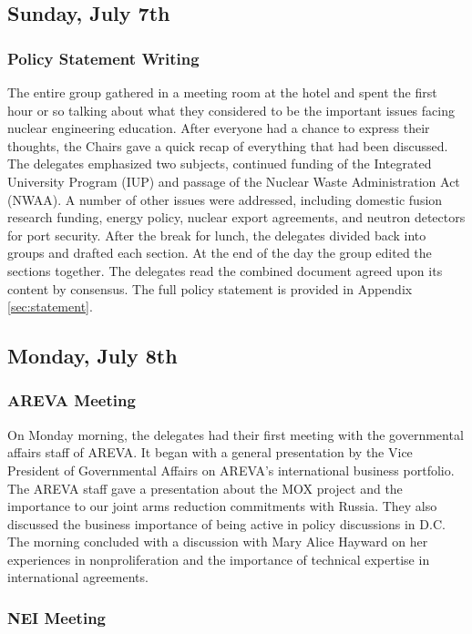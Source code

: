 
\subsection*{Sunday, July 7th}

\subsubsection*{Policy Statement Writing}

The entire group gathered in a meeting room at the hotel and spent the first
hour or so talking about what they considered to be the important issues facing
nuclear engineering education. After everyone had a chance to express their
thoughts, the Chairs gave a quick recap of everything that had been
discussed. The delegates emphasized two subjects, continued funding of the
Integrated University Program (IUP) and passage of the Nuclear Waste
Administration Act (NWAA). A number of other issues were addressed, including
domestic fusion research funding, energy policy, nuclear export agreements, and
neutron detectors for port security. After the break for lunch, the delegates
divided back into groups and drafted each section. At the end of the day the
group edited the sections together. The delegates read the combined document
agreed upon its content by consensus. The full policy statement is provided in
Appendix \ref{sec:statement}.

\subsection*{Monday, July 8th}

\subsubsection*{AREVA Meeting} 

On Monday morning, the delegates had their first meeting with the governmental
affairs staff of AREVA. It began with a general presentation by the Vice
President of Governmental Affairs on AREVA's international business
portfolio. The AREVA staff gave a presentation about the MOX project and the
importance to our joint arms reduction commitments with Russia. They also
discussed the business importance of being active in policy discussions in
D.C. The morning concluded with a discussion with Mary Alice Hayward on her
experiences in nonproliferation and the importance of technical expertise in
international agreements.

\subsubsection*{NEI Meeting} 

